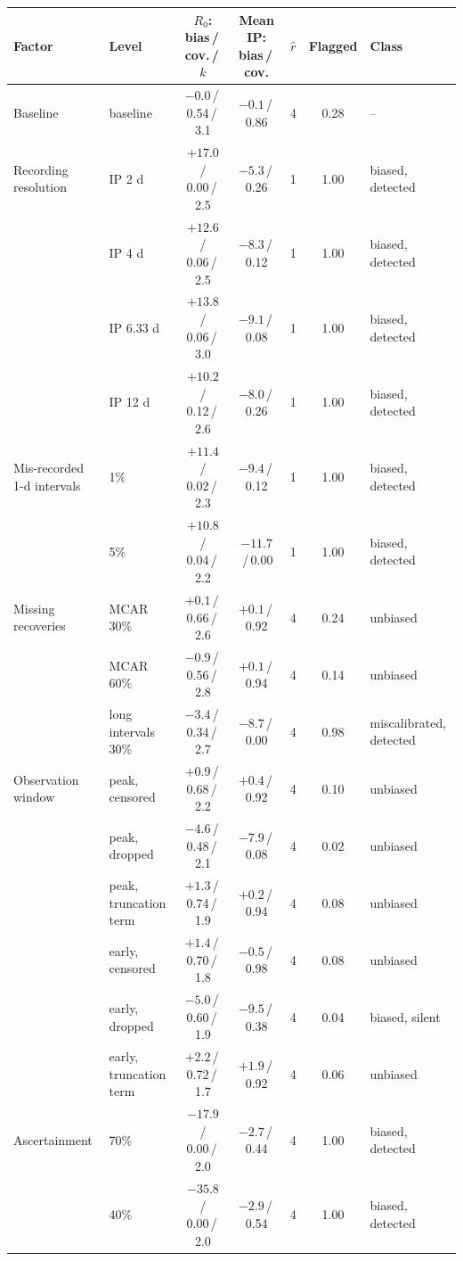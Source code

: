 \begin{tabular}{l l c c c c l}
\toprule
Factor & Level & $R_0$: bias\,/\,cov.\,/\,$k$ & Mean IP: bias\,/\,cov. & $\hat r$ & Flagged & Class \\
\midrule
Baseline & baseline & $-0.0$\,/\,0.54\,/\,3.1 & $-0.1$\,/\,0.86 & 4 & 0.28 & -- \\
Recording resolution & IP 2 d & ${+}17.0$\,/\,0.00\,/\,2.5 & $-5.3$\,/\,0.26 & 1 & 1.00 & biased, detected \\
 & IP 4 d & ${+}12.6$\,/\,0.06\,/\,2.5 & $-8.3$\,/\,0.12 & 1 & 1.00 & biased, detected \\
 & IP 6.33 d & ${+}13.8$\,/\,0.06\,/\,3.0 & $-9.1$\,/\,0.08 & 1 & 1.00 & biased, detected \\
 & IP 12 d & ${+}10.2$\,/\,0.12\,/\,2.6 & $-8.0$\,/\,0.26 & 1 & 1.00 & biased, detected \\
Mis-recorded 1-d intervals & 1\% & ${+}11.4$\,/\,0.02\,/\,2.3 & $-9.4$\,/\,0.12 & 1 & 1.00 & biased, detected \\
 & 5\% & ${+}10.8$\,/\,0.04\,/\,2.2 & $-11.7$\,/\,0.00 & 1 & 1.00 & biased, detected \\
Missing recoveries & MCAR 30\% & ${+}0.1$\,/\,0.66\,/\,2.6 & ${+}0.1$\,/\,0.92 & 4 & 0.24 & unbiased \\
 & MCAR 60\% & $-0.9$\,/\,0.56\,/\,2.8 & ${+}0.1$\,/\,0.94 & 4 & 0.14 & unbiased \\
 & long intervals 30\% & $-3.4$\,/\,0.34\,/\,2.7 & $-8.7$\,/\,0.00 & 4 & 0.98 & miscalibrated, detected \\
Observation window & peak, censored & ${+}0.9$\,/\,0.68\,/\,2.2 & ${+}0.4$\,/\,0.92 & 4 & 0.10 & unbiased \\
 & peak, dropped & $-4.6$\,/\,0.48\,/\,2.1 & $-7.9$\,/\,0.08 & 4 & 0.02 & unbiased \\
 & peak, truncation term & ${+}1.3$\,/\,0.74\,/\,1.9 & ${+}0.2$\,/\,0.94 & 4 & 0.08 & unbiased \\
 & early, censored & ${+}1.4$\,/\,0.70\,/\,1.8 & $-0.5$\,/\,0.98 & 4 & 0.08 & unbiased \\
 & early, dropped & $-5.0$\,/\,0.60\,/\,1.9 & $-9.5$\,/\,0.38 & 4 & 0.04 & biased, silent \\
 & early, truncation term & ${+}2.2$\,/\,0.72\,/\,1.7 & ${+}1.9$\,/\,0.92 & 4 & 0.06 & unbiased \\
Ascertainment & 70\% & $-17.9$\,/\,0.00\,/\,2.0 & $-2.7$\,/\,0.44 & 4 & 1.00 & biased, detected \\
 & 40\% & $-35.8$\,/\,0.00\,/\,2.0 & $-2.9$\,/\,0.54 & 4 & 1.00 & biased, detected \\

\end{tabular}
